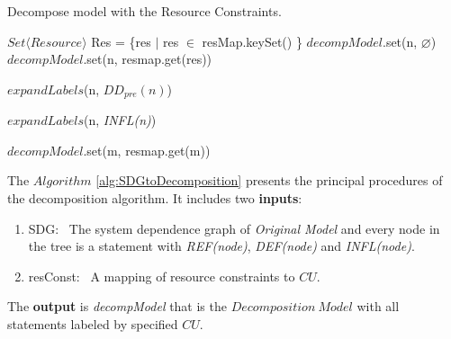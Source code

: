 \begin{algorithm}[htb!]
\label{alg:SDGtoDecomposition}
    \caption{Decompose model with the Resource Constraints.}
    \BlankLine

    $Set\langle Resource \rangle$ Res = \{res $|$ res $\in$ resMap.keySet() \}\;
    {
       $decompModel$.set(n, $\varnothing$)\;
       {
            {
                $decompModel$.set(n, resmap.get(res))\;
            }
       }
    }

    {
        $expandLabels$(n, $DD_{pre}(n)$)\;
    }

    {
        $expandLabels$(n, \emph{INFL(n)})\;
    }

    {
        {
            {
                $decompModel$.set(m, resmap.get(m))\;
            }
        }
    }
\end{algorithm}

The $Algorithm $ \ref{alg:SDGtoDecomposition} presents the principal procedures of the decomposition algorithm.
It includes two \textbf{inputs}:
\begin{enumerate}
  \item SDG: \ The system dependence graph of \emph{Original Model} and every node in the tree is a statement with \emph{REF(node)}, \emph{DEF(node)} and \emph{INFL(node)}.
  \item resConst: \ A mapping of resource constraints to $CU$.
\end{enumerate}
The \textbf{output} is \emph{decompModel} that is the $Decomposition \ Model$ with all statements labeled by specified $CU$.

